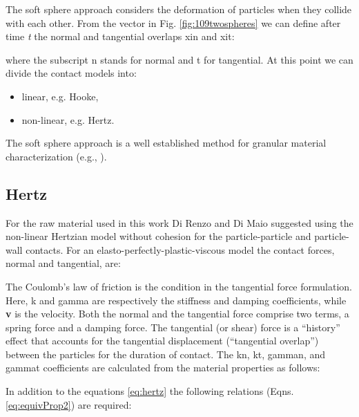 
The soft sphere approach considers the deformation of particles when they
collide with each other. From the vector in Fig. \ref{fig:109twospheres} we can
define after time \textit{t} the normal and tangential overlaps \acs{xin} and
\acs{xit}:


where the subscript \acs{n} stands for normal and \acs{t} for tangential. 
At this point we can divide the contact models into:
\begin{itemize}
  \item{linear, e.g. Hooke,}
  \item{non-linear, e.g. Hertz.}
\end{itemize}

The soft sphere approach is a well established method for granular
material characterization (e.g., \citet{RefWorks:71, RefWorks:74, RefWorks:76,
RefWorks:79, RefWorks:81, RefWorks:92, RefWorks:97, RefWorks:99,
RefWorks:108, RefWorks:209, RefWorks:210, RefWorks:211, RefWorks:212}).

\subsection{Hertz}
\label{subsec:hertz}

For the raw material used in this work 
Di Renzo and Di Maio \cite{RefWorks:145} suggested using the non-linear
Hertzian model without cohesion for the particle-particle and particle-wall contacts. 
For an elasto-perfectly-plastic-viscous model the contact forces, normal and
tangential, are:


The Coulomb's law of friction is the condition in the tangential force
formulation.\\
Here, \acs{k} and \acs{gamma} are respectively the stiffness and damping
coefficients, while \textbf{v} is the velocity.
Both the normal and the tangential
force comprise two terms, a spring force and a damping force. 
The tangential (or shear) force is a ``history'' effect that accounts for the
tangential displacement (``tangential overlap'') between the particles for the
duration of contact.
The \acs{kn}, \acs{kt}, \acs{gamman}, and \acs{gammat} coefficients are
calculated from the material properties as follows:

In addition to the equations \ref{eq:hertz} the following relations (Eqns. \ref{eq:equivProp2}) are required:


